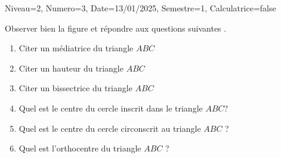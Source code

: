 \documentclass[a4paper,12pt]{article}
\begin{document}
\begin{Maquette}[DS]{Niveau=2, Numero=3, Date=13/01/2025, Semestre=1, Calculatrice=false}
\begin{exercice}[6]

Observer bien la figure et répondre aux questions suivantes .
\begin{enumerate}
\item{} Citer un médiatrice du triangle $ABC$
\anserline[1]
\item{} Citer un hauteur du triangle $ABC$
\anserline[1]
\item{} Citer un bissectrice du triangle $ABC$
\anserline[1]
\item{} Quel est le centre du cercle inscrit dans le triangle $ABC$?
\anserline[1]
\item{} Quel est le centre du cercle circonscrit au triangle $ABC$ ?
\anserline[1]
\item{} Quel est l'orthocentre du triangle $ABC$ ?
\anserline[1]
\end{enumerate}
\end{exercice}



\end{Maquette}
\end{document}

